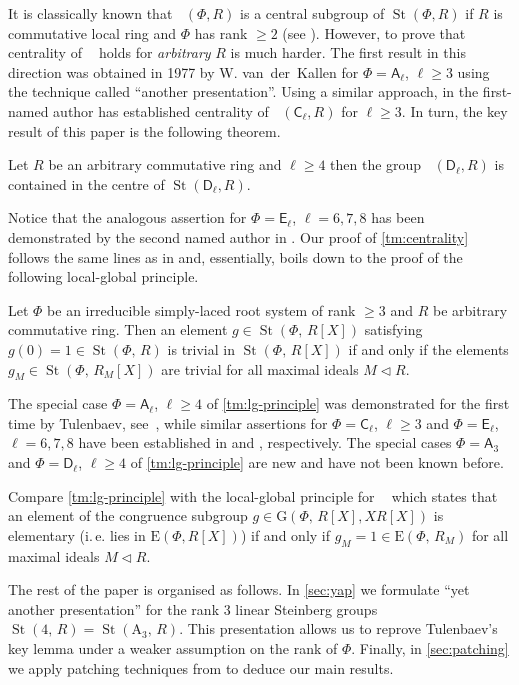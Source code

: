 \documentclass[11pt]{amsart}
\theoremstyle{plain} \declaretheorem[name=Theorem, Refname={Theorem,Theorems}]{tm} \Crefname{tm}{Theorem}{Theorems}
\numberwithin{equation}{section}
\theoremstyle{definition} \newtheorem{df}[lm]{Definition} \Crefname{df}{Definition}{Definitions}
\theoremstyle{remark} \newtheorem{rk}[lm]{Remark} \Crefname{rk}{Remark}{Remarks}
\newcommand{\E}{{\mathrm{E}}}
\newcommand{\GG}{{\mathrm{G}}}
\newcommand{\St}{\mathop{\mathrm{St}}\nolimits}
\newcommand{\SL}{\mathop{\mathrm{SL}}\nolimits}
\newcommand{\Kt}{\mathop{\mathrm{K_2}}\nolimits}
\newcommand{\Ko}{\mathop{\mathrm{K_1}}\nolimits}
\newcommand{\rA}{\mathsf{A}}
\newcommand{\rC}{\mathsf{C}}
\newcommand{\rD}{\mathsf{D}}
\newcommand{\rE}{\mathsf{E}}
\begin{document}
It is classically known that $\Kt(\Phi, R)$ is a central subgroup of $\St(\Phi, R)$ if $R$ is commutative local ring and $\Phi$ has rank $\geq 2$ (see \cite{Stein}).
However, to prove that centrality of $\Kt$ holds for \emph{arbitrary} $R$ is much harder.
The first result in this direction was obtained in 1977 by W. van~der~Kallen for $\Phi=\rA_\ell$, $\ell\geq 3$ using the technique called ``another presentation''.
Using a similar approach, in \cite{Lav} the first-named author has established centrality of $\Kt(\rC_\ell, R)$ for $\ell\geq 3$.
In turn, the key result of this paper is the following theorem.
\begin{tm}\label{tm:centrality}  Let $R$ be an arbitrary commutative ring and $\ell\geq 4$ then 
the group $\Kt(\rD_\ell, R)$ is contained in the centre of $\St(\rD_\ell, R)$. \end{tm}
Notice that the analogous assertion for $\Phi=\rE_\ell$, $\ell=6,7,8$ has been demonstrated by the second named author in \cite{SCh}.
Our proof of \cref{tm:centrality} follows the same lines as in \cite[Theorem~1]{SCh} and, essentially, boils down to the proof of the following local-global principle.
\begin{tm}\label{tm:lg-principle} Let $\Phi$ be an irreducible simply-laced root system of rank $\geq 3$ and $R$ be arbitrary commutative ring.
Then an element $g\in\St(\Phi,\,R[X])$ satisfying $g(0)=1\in\St(\Phi,\,R)$ is trivial in $\St(\Phi,\,R[X])$
if and only if the elements $g_M\in\St(\Phi,\,R_M[X])$ are trivial for all maximal ideals $M\triangleleft R$. \end{tm} 

The special case $\Phi=\rA_\ell$, $\ell\geq 4$ of \cref{tm:lg-principle} was demonstrated for the first time by Tulenbaev, see~\cite[Theorem~2.1]{Tul},
while similar assertions for $\Phi=\rC_\ell$, $\ell\geq 3$ and $\Phi=\rE_\ell$, $\ell=6,7,8$ have been established in \cite{Lav2} and \cite{SCh}, respectively.
The special cases $\Phi=\rA_3$ and $\Phi=\rD_\ell$, $\ell\geq 4$ of \cref{tm:lg-principle} are new and have not been known before.

Compare \cref{tm:lg-principle} with the local-global principle for $\Ko$ which states that an element of the congruence subgroup $g\in \GG(\Phi,\,R[X], XR[X])$ is elementary
(i.\,e. lies in $\E(\Phi, R[X])$) if and only if $g_M=1\in\E(\Phi,\,R_M)$ for all maximal ideals $M \triangleleft R$.

The rest of the paper is organised as follows. 
In \cref{sec:yap} we formulate ``yet another presentation'' for the rank $3$ linear Steinberg groups $\St(4,\,R)=\St(\mathrm A_3,\,R)$.
This presentation allows us to reprove Tulenbaev's key lemma \cite[Lemma~2.3]{Tul} under a weaker assumption on the rank of $\Phi$.
Finally, in \cref{sec:patching} we apply patching techniques from \cite{SCh} to deduce our main results.
\end{document}
